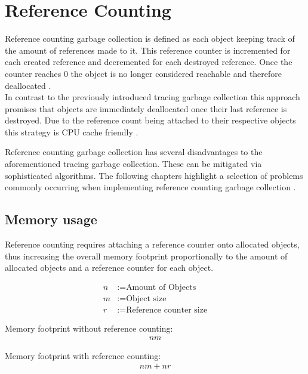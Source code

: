 \section{Reference Counting}

Reference counting garbage collection is defined as each object keeping track
of the amount of references made to it. This reference counter is incremented
for each created reference and decremented for each destroyed reference. Once
the counter reaches 0 the object is no longer considered reachable and
therefore deallocated \cite[2.2 Precise Reference Counting]{gc-references_2021}
\cite[6. Reference Counting Automatic Storage Reclamation
Algorithms]{gc-generational-scavenging_1984}. \\

In contrast to the previously introduced tracing garbage collection this
approach promises that objects are immediately deallocated once their last
reference is destroyed. Due to the reference count being attached to their
respective objects this strategy is CPU cache friendly \cite[1.
Introduction]{gc-references_2021}.

Reference counting garbage collection has several disadvantages to the
aforementioned tracing garbage collection. These can be mitigated via
sophisticated algorithms. The following chapters highlight a selection of
problems commonly occurring when implementing reference counting garbage
collection \cite[2. Overview]{gc-references_2021}.

\subsection{Memory usage}
Reference counting requires attaching a reference counter onto allocated
objects, thus increasing the overall memory footprint proportionally to the
amount of allocated objects and a reference counter for each object.

\begin{align*}
n &:= \textrm{Amount of Objects}\\
m &:= \textrm{Object size} \\
r &:= \textrm{Reference counter size}
\end{align*}

Memory footprint without reference counting:
\begin{align*}
nm 
\end{align*}

Memory footprint with reference counting:
\begin{align*}
nm + nr
\end{align*}

